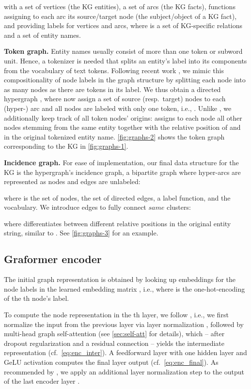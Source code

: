\documentclass[11pt]{article}
\newcommand{\para}[1]{\noindent\textbf{#1.}}
\newcommand{\same}{\ensuremath{\mathit{same}}}
\begin{document}
with  a set of vertices (the KG entities),
 a set of arcs (the KG facts),  functions assigning to each arc its source/target node (the subject/object of a KG fact),
and  providing labels for vertices and arcs,
where  is a set of KG-specific relations and  a set of entity names.

\para{Token graph}
Entity names usually consist of more than one token or subword unit.
Hence, a tokenizer  is
needed that
splits an entity's label into its components from the vocabulary  of text tokens.
Following recent work \citep{ribeiro20},
we mimic this compositionality of node labels in the graph structure
by splitting each node into as many nodes as there are tokens in its label.
We thus obtain a directed hypergraph ,
where  now assign a set of source (resp.\ target) nodes to each (hyper-) arc and all nodes are labeled with only one token,
i.e., .
Unlike \citet{ribeiro20},
we additionally keep track of all token nodes' origins:
 assigns to each node  all other nodes  stemming from the same entity together with the relative position of  and  in the original tokenized entity name.
\cref{fig:graphs-2} shows the token graph corresponding  to the KG in \cref{fig:graphs-1}.

\para{Incidence graph}
For ease of implementation,
our final data structure for the KG is the hypergraph's incidence graph,
a bipartite graph where hyper-arcs are represented as nodes and edges are unlabeled:

where  is the set of nodes,
 the set of directed edges,
 a label function,
and  the vocabulary.
We introduce  edges to fully connect \same{} clusters:

where  differentiates between different relative positions in the original entity string,
similar to \citep{shaw-etal-2018-self}.
See \cref{fig:graphs-3} for an example.


\subsection{Graformer encoder}
\label{sec:graph-encoder}

The initial graph representation  is obtained by looking up embeddings for the node labels in the learned embedding matrix , i.e.,
 where  is the one-hot-encoding of the th node's label.

To compute the node representation  in the th layer,
we follow \citet{vaswani17}, i.e.,
we first normalize the input from the previous layer  via layer normalization ,
followed by multi-head graph self-attention  (see \cref{sec:self-att} for details),
which
-- after dropout regularization  and a residual connection --
yields the intermediate representation  (cf.\ \cref{eq:enc_inter}).
A feedforward layer  with one hidden layer and GeLU \citep{hendrycks16} activation
computes the final layer output (cf.\ \cref{eq:enc_final}).
As recommended by \citet{chen-etal-2018-best}, we apply an additional layer normalization step to the output  of the last encoder layer .
\end{document}
